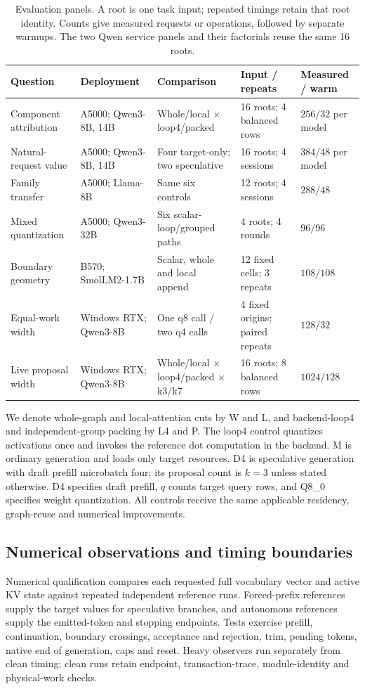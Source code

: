 \begin{table}[t]
\centering\footnotesize\tighttable
\caption{Evaluation panels. A root is one task input; repeated timings retain that root identity. Counts give measured requests or operations, followed by separate warmups. The two Qwen service panels and their factorials reuse the same 16 roots.}
\label{tab:panels}
\begin{tabularx}{\textwidth}{@{}L{2.22cm}L{2.48cm}L{2.62cm}L{2.24cm}Y@{}}\toprule
Question & Deployment & Comparison & Input / repeats & Measured / warm\\\midrule
Component attribution & A5000; Qwen3-8B, 14B & Whole/local $\times$ loop4/packed & 16 roots; 4 balanced rows & $256/32$ per model\\
Natural-request value & A5000; Qwen3-8B, 14B & Four target-only; two speculative & 16 roots; 4 sessions & $384/48$ per model\\
Family transfer & A5000; Llama-8B & Same six controls & 12 roots; 4 sessions & $288/48$\\
Mixed quantization & A5000; Qwen3-32B & Six scalar-loop/grouped paths & 4 roots; 4 rounds & $96/96$\\
Boundary geometry & B570; SmolLM2-1.7B & Scalar, whole and local append & 12 fixed cells; 3 repeats & $108/108$\\
Equal-work width & Windows RTX; Qwen3-8B & One q8 call / two q4 calls & 4 fixed origins; paired repeats & $128/32$\\
Live proposal width & Windows RTX; Qwen3-8B & Whole/local $\times$ loop4/packed $\times$ k3/k7 & 16 roots; 8 balanced rows & $1024/128$\\\bottomrule
\end{tabularx}
\end{table}

We denote whole-graph and local-attention cuts by W and L, and backend-loop4 and independent-group packing by L4 and P. The loop4 control quantizes activations once and invokes the reference dot computation in the backend. M is ordinary generation and loads only target resources. D4 is speculative generation with draft prefill microbatch four; its proposal count is $k=3$ unless stated otherwise. D4 specifies draft prefill, $q$ counts target query rows, and Q8\_0 specifies weight quantization. All controls receive the same applicable residency, graph-reuse and numerical improvements.

\subsection{Numerical observations and timing boundaries}
Numerical qualification compares each requested full vocabulary vector and active KV state against repeated independent reference runs. Forced-prefix references supply the target values for speculative branches, and autonomous references supply the emitted-token and stopping endpoints. Tests exercise prefill, continuation, boundary crossings, acceptance and rejection, trim, pending tokens, native end of generation, caps and reset. Heavy observers run separately from clean timing; clean runs retain endpoint, transaction-trace, module-identity and physical-work checks.

